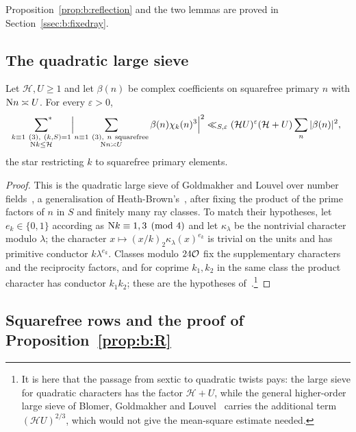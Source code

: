 Proposition~\ref{prop:b:reflection} and the two lemmas are proved in Section~\ref{ssec:b:fixedray}.

\subsection{The quadratic large sieve}\label{ssec:b:sieve}

\begin{lemma}\label{lem:b:quadratic}
Let $\mathcal H,U\ge1$ and let $\beta(n)$ be complex coefficients on squarefree primary $n$ with $\mathrm{N} n\asymp U$. For every $\varepsilon>0$,
\begin{equation}\label{eq:b:Q}
  \sideset{}{^*}\sum_{\substack{k\equiv1\ (3),\ (k,S)=1\\\mathrm{N} k\le\mathcal H}}\Bigl|\sum_{\substack{n\equiv1\ (3),\ n\ {\rm squarefree}\\\mathrm{N} n\asymp U}}\beta(n)\chi_k(n)^3\Bigr|^2\ll_{S,\varepsilon}(\mathcal HU)^\varepsilon(\mathcal H+U)\sum_n|\beta(n)|^2,
\end{equation}
the star restricting $k$ to squarefree primary elements.
\end{lemma}

\begin{proof}
This is the quadratic large sieve of Goldmakher and Louvel over number fields~\cite[Theorem~1.1]{GL}, a generalisation of Heath-Brown's~\cite{HB95}, after fixing the product of the prime factors of $n$ in $S$ and finitely many ray classes. To match their hypotheses, let $e_k\in\{0,1\}$ according as $\mathrm{N} k\equiv1,3\pmod4$ and let $\kappa_\lambda$ be the nontrivial character modulo $\lambda$; the character $x\mapsto(x/k)_2\kappa_\lambda(x)^{e_k}$ is trivial on the units and has primitive conductor $k\lambda^{e_k}$. Classes modulo $24\mathcal{O}$ fix the supplementary characters and the reciprocity factors, and for coprime $k_1,k_2$ in the same class the product character has conductor $k_1k_2$; these are the hypotheses of~\cite[Definition~1 and \S2]{GL}.\footnote{It is here that the passage from sextic to quadratic twists pays: the large sieve for quadratic characters has the factor $\mathcal H+U$, while the general higher-order large sieve of Blomer, Goldmakher and Louvel~\cite[Theorem~1.3]{BGL} carries the additional term $(\mathcal HU)^{2/3}$, which would not give the mean-square estimate needed.}
\end{proof}

\subsection{Squarefree rows and the proof of Proposition~\ref{prop:b:R}}\label{ssec:b:squarefreerows}

